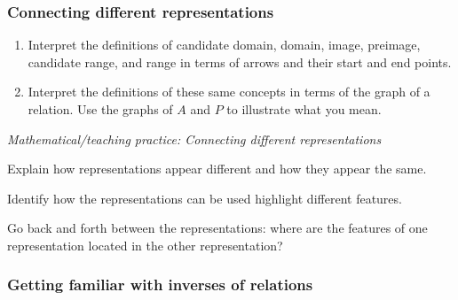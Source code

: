 \documentclass[11pt]{article}
\newcommand{\handout}{\subsubsection}
\theoremstyle{definition}
\begin{document}
\newpage
\subsubsection*{Connecting different representations}
\begin{enumerate}[resume]
\item  Interpret the definitions of candidate domain, domain, image, preimage, candidate range, and range in terms of arrows and their start and end points.
\item Interpret the definitions of these same concepts in terms of the graph of a relation. Use the graphs of $A$ and $P$ to illustrate what you mean.
\end{enumerate}


\vfill
{\it Mathematical/teaching practice: Connecting different representations}
\begin{itemize*}
\item Explain how representations appear different and how they appear the same.
\item Identify how the representations can be used highlight different features. 
\item Go back and forth between the representations: where are the features of one representation located in the other representation?
\end{itemize*}

\newpage 
\handout{Getting familiar with inverses of relations}
\end{document}
